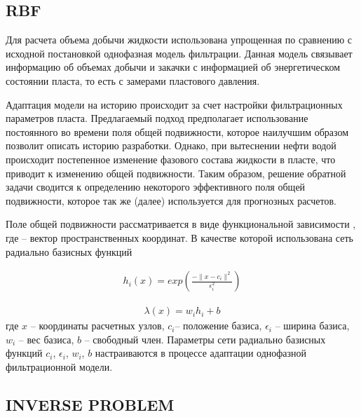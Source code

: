 \documentclass{article}
\begin{document}
\subsection{RBF}

Для расчета объема добычи жидкости использована упрощенная по сравнению с исходной постановкой однофазная модель фильтрации. Данная модель связывает информацию об объемах добычи и закачки с информацией об энергетическом состоянии пласта, то есть с замерами пластового давления. 

Адаптация модели на историю происходит за счет настройки фильтрационных параметров пласта. Предлагаемый подход предполагает использование постоянного во времени поля общей подвижности, которое наилучшим образом позволит описать историю разработки. Однако, при вытеснении нефти водой происходит постепенное изменение фазового состава жидкости в пласте, что приводит к изменению общей подвижности. Таким образом, решение обратной задачи сводится к определению некоторого эффективного поля общей подвижности, которое так же (далее) используется для прогнозных расчетов.

Поле общей подвижности  рассматривается в виде функциональной зависимости , где  – вектор пространственных координат. В качестве которой использована сеть радиально базисных функций

\begin{eqnarray}
	h_i(x) = exp \left(\frac{-\lVert x - c_i \rVert^2}{\epsilon^2_i}\right)
\end{eqnarray}

\begin{eqnarray}
	\lambda(x) = w_ih_i + b
\end{eqnarray}
где $x$ – координаты расчетных узлов,  $c_i$– положение базиса, $\epsilon_i$ – ширина базиса, $w_i$ – вес базиса, $b$ – свободный член. Параметры сети радиально базисных функций $c_i$, $\epsilon_i$, $w_i$, $b$  настраиваются в процессе адаптации однофазной фильтрационной модели.

\subsection{INVERSE PROBLEM}
\end{document}
